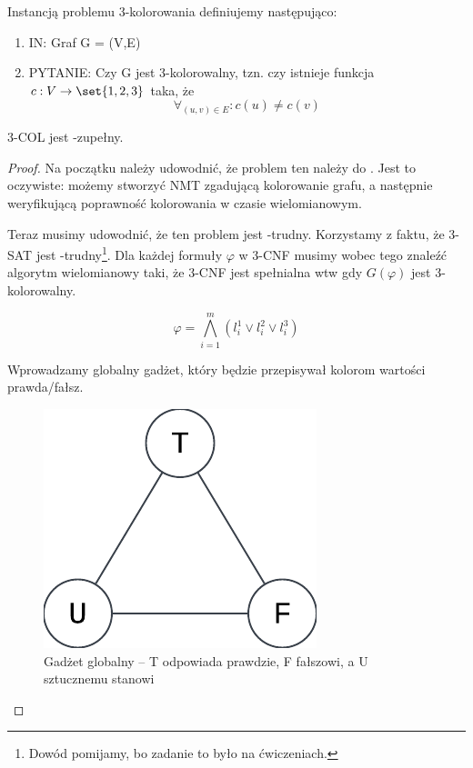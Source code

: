 \begin{definition}
	Instancją problemu 3-kolorowania definiujemy następująco:
	\begin{enumerate}
		\item IN: Graf G = (V,E)
		\item PYTANIE: Czy G jest 3-kolorowalny, tzn. czy istnieje funkcja \(c : V \rightarrow \set{1, 2, 3} \) taka, że \[
			      \forall_{(u, v) \in E} : c(u) \neq c(v)
		      \]
	\end{enumerate}
\end{definition}

\begin{theorem}
	3-COL jest \np-zupełny.
\end{theorem}
\begin{proof}
	Na początku należy udowodnić, że problem ten należy do \np. Jest to oczywiste: możemy stworzyć NMT zgadującą kolorowanie grafu, a następnie weryfikującą poprawność kolorowania w czasie wielomianowym.

	Teraz musimy udowodnić, że ten problem jest \np-trudny. Korzystamy z faktu, że 3-SAT jest \np-trudny\footnote{Dowód pomijamy, bo zadanie to było na ćwiczeniach.}. Dla każdej formuły $\varphi$ w 3-CNF musimy wobec tego znaleźć algorytm wielomianowy taki, że 3-CNF jest spełnialna wtw gdy $G(\varphi)$ jest 3-kolorowalny.

	\begin{equation*}
		\varphi = \bigwedge_{i=1}^m (l_i^1 \lor l_i^2 \lor l_i^3)
	\end{equation*}

	Wprowadzamy globalny gadżet, który będzie przepisywał kolorom wartości prawda/fałsz.

	\begin{figure}[H]
		\centering
		\includegraphics{img/3-coloring-global-gadget.png}
		\caption{Gadżet globalny -- T odpowiada prawdzie, F fałszowi, a U sztucznemu stanowi}
	\end{figure}


\end{proof}
